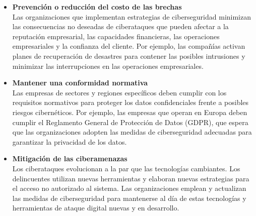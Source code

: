 \documentclass[11pt]{report}
\begin{document}
\begin{itemize}
  \item \textbf{Prevención o reducción del costo de las brechas} \\
  Las organizaciones que implementan estrategias de ciberseguridad minimizan las consecuencias no deseadas de ciberataques
  que pueden afectar a la reputación empresarial, las capacidades financieras, las operaciones empresariales y la confianza
  del cliente. Por ejemplo, las compañías activan planes de recuperación de desastres para contener las posibles intrusiones
  y minimizar las interrupciones en las operaciones empresariales.

  \item \textbf{Mantener una conformidad normativa} \\
  Las empresas de sectores y regiones específicos deben cumplir con los requisitos normativos para proteger los datos confidenciales
  frente a posibles riesgos cibernéticos. Por ejemplo, las empresas que operan en Europa deben cumplir el Reglamento General de Protección de Datos (GDPR),
  que espera que las organizaciones adopten las medidas de ciberseguridad adecuadas para garantizar la privacidad de los datos. 

  \item \textbf{Mitigación de las ciberamenazas} \\
  Los ciberataques evolucionan a la par que las tecnologías cambiantes. Los delincuentes utilizan nuevas herramientas y elaboran nuevas estrategias para el acceso 
  no autorizado al sistema. Las organizaciones emplean y actualizan las medidas de ciberseguridad para mantenerse al día de estas tecnologías y herramientas de ataque
  digital nuevas y en desarrollo. 
\end{itemize}
\end{document}
